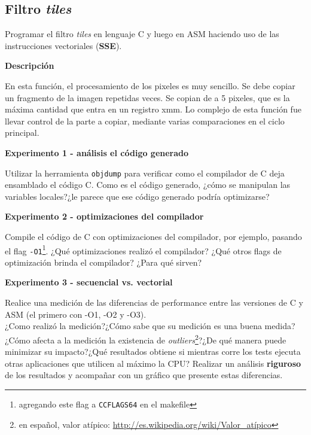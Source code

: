 \subsection*{Filtro \textit{tiles}}

Programar el filtro \textit{tiles} en lenguaje C y luego en ASM haciendo uso de las instrucciones vectoriales (\textbf{SSE}).
    

\vspace*{0.3cm} \noindent
\textbf{Descripción}

En esta función, el procesamiento de los pixeles es muy sencillo. Se debe copiar un fragmento de la imagen repetidas veces. Se copian de a 5 
pixeles, que es la máxima cantidad que entra en un registro xmm. Lo complejo de esta función fue llevar control de la parte a copiar, mediante
varias comparaciones en el ciclo principal.


\vspace*{0.3cm} \noindent
\textbf{Experimento 1 - análisis el código generado}

Utilizar la herramienta \verb|objdump| para verificar como el compilador de C deja ensamblado el código C. Como es el código generado, ¿cómo se manipulan las variables locales?¿le parece que ese código generado podría optimizarse?

\newpage
\vspace*{0.3cm} \noindent
\textbf{Experimento 2 - optimizaciones del compilador}

Compile el código de C con optimizaciones del compilador, por ejemplo, pasando el flag \verb|-O1|\footnote{agregando este flag a \texttt{CCFLAGS64} en el makefile}. 
¿Qué optimizaciones realizó el compilador?
¿Qué otros flags de optimización brinda el compilador?
¿Para qué sirven?


\vspace*{0.3cm} \noindent
\textbf{Experimento 3 - secuencial vs. vectorial}

	Realice una medición de las diferencias de performance entre las versiones
	de C y ASM (el primero con -O1, -O2 y -O3).\\
	¿Como realizó la medición?¿Cómo sabe que su medición es una buena medida?¿Cómo afecta a la medición la existencia de \emph{outliers}\footnote{en español, valor atípico: \url{http://es.wikipedia.org/wiki/Valor_atípico}}?¿De qué manera puede minimizar su impacto?¿Qué resultados obtiene si mientras corre los tests ejecuta otras aplicaciones que utilicen al máximo la CPU? 
	Realizar un análisis \textbf{riguroso} de los resultados y acompañar con un gráfico que presente estas diferencias.


